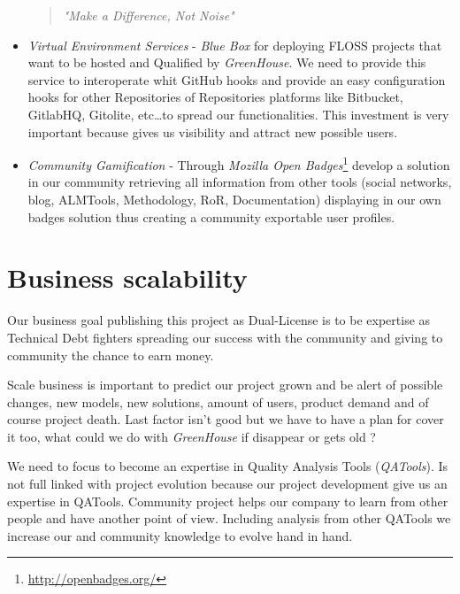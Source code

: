 \documentclass[11pt]{scrartcl}
\begin{document}
\begin{itemize}
	 \begin{quotation}
	    \begin{center}
	    \emph{"Make a Difference, Not Noise"}
	    \end{center}
	 \end{quotation}
    \item \emph{Virtual Environment Services} - \emph{Blue Box} for deploying FLOSS projects that want to be hosted and Qualified by \emph{GreenHouse}. We need to provide this service to interoperate whit GitHub hooks and provide an easy configuration hooks for other Repositories of Repositories platforms like Bitbucket, GitlabHQ, Gitolite, etc\ldots to spread our functionalities. This investment is very important because gives us visibility and attract new possible users.
    \item \emph{Community Gamification} - Through \emph{Mozilla Open Badges}\footnote{\url{http://openbadges.org/}} develop a solution in our community retrieving all information from other tools (social networks, blog, ALMTools, Methodology, RoR, Documentation) displaying in our own badges solution thus creating a community exportable user profiles.
\end{itemize}



\section{Business scalability}
\label{sec:scalability}

\par Our business goal publishing this project as Dual-License is to be expertise as Technical Debt fighters spreading our success with the community and giving to community the chance to earn money.

\par Scale business is important to predict our project grown and be alert of possible changes, new models, new solutions, amount of users, product demand and of course project death. Last factor isn't good but we have to have a plan for cover it too, what could we do with \emph{GreenHouse} if disappear or gets old ? 

\par We need to focus to become an expertise in Quality Analysis Tools (\emph{QATools}). Is not full linked with project evolution because our project development give us an expertise in QATools. Community project helps our company to learn from other people and have another point of view. Including analysis from other QATools we increase our and community knowledge to evolve hand in hand.
\end{document}
